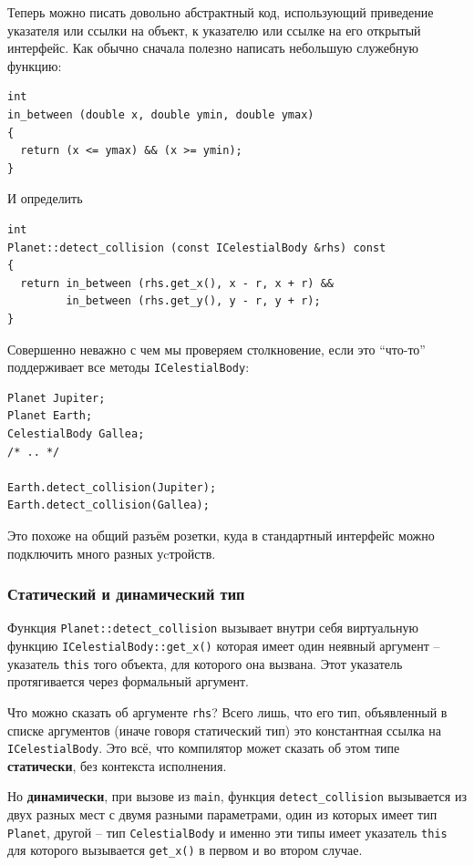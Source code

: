 \documentclass[a4paper,12pt,oneside]{article}
\begin{document}
Теперь можно писать довольно абстрактный код, использующий приведение указателя или ссылки на объект, к указателю или ссылке на его открытый интерфейс. Как обычно сначала полезно написать небольшую служебную функцию:

\begin{lstlisting}
int 
in_between (double x, double ymin, double ymax)
{
  return (x <= ymax) && (x >= ymin);
}
\end{lstlisting}

И определить

\begin{lstlisting}
int 
Planet::detect_collision (const ICelestialBody &rhs) const
{
  return in_between (rhs.get_x(), x - r, x + r) && 
         in_between (rhs.get_y(), y - r, y + r);
}
\end{lstlisting}

Совершенно неважно с чем мы проверяем столкновение, если это ``что-то'' поддерживает все методы \lstinline!ICelestialBody!:

\begin{lstlisting}
Planet Jupiter;
Planet Earth;
CelestialBody Gallea;
/* .. */

Earth.detect_collision(Jupiter); 
Earth.detect_collision(Gallea);
\end{lstlisting}

Это похоже на общий разъём розетки, куда в стандартный интерфейс можно подключить много разных уcтройств.

\subsubsection{Статический и динамический тип}

Функция \lstinline!Planet::detect_collision! вызывает внутри себя виртуальную функцию \lstinline!ICelestialBody::get_x()! которая имеет один неявный аргумент -- указатель \lstinline!this! того объекта, для которого она вызвана. Этот указатель протягивается через формальный аргумент. 

Что можно сказать об аргументе \lstinline!rhs!? Всего лишь, что его тип, объявленный в списке аргументов (иначе говоря статический тип) это константная ссылка на \lstinline!ICelestialBody!. Это всё, что компилятор может сказать об этом типе \textbf{статически}, без контекста исполнения.

Но \textbf{динамически}, при вызове из \lstinline!main!, функция \lstinline!detect_collision! вызывается из двух разных мест с двумя разными параметрами, один из которых имеет тип \lstinline!Planet!, другой – тип \lstinline!CelestialBody! и именно эти типы имеет указатель \lstinline!this! для которого вызывается \lstinline!get_x()! в первом и во втором случае.
\end{document}
